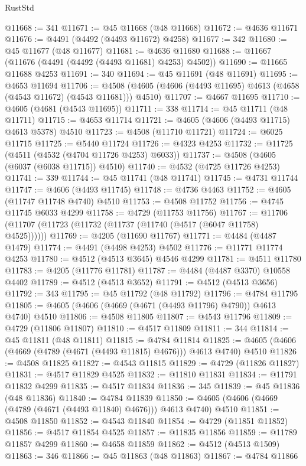\begin{lexlean}{RustStd}
\begin{coremodule}
@11668 := 341
@11671 := @45 @11668 (@48 @11668)
@11672 := @4636 @11671
@11676 := @4491 (@4492 (@4493 @11672) @4258)
@11677 := 342
@11680 := @45 @11677 (@48 @11677)
@11681 := @4636 @11680
@11688 := @11667 (@11676 (@4491 (@4492 (@4493 @11681) @4253) @4502))
@11690 := @11665 @11688 @4253
@11691 := 340
@11694 := @45 @11691 (@48 @11691)
@11695 := @4653 @11694
@11706 := @4508 (@4605 (@4606 (@4493 @11695) @4613 (@4658 (@4543 @11672) (@4543 @11681))) @4510)
@11707 := @4667 @11695
@11710 := @4605 (@4681 (@4543 @11695))
@11711 := 338
@11714 := @45 @11711 (@48 @11711)
@11715 := @4653 @11714
@11721 := @4605 (@4606 (@4493 @11715) @4613 @5378) @4510
@11723 := @4508 (@11710 @11721)
@11724 := @6025 @11715
@11725 := @5440 @11724
@11726 := @4323 @4253
@11732 := @11725 (@4511 (@4532 (@4704 @11726 @4253) @6033))
@11737 := @4508 (@4605 (@6037 (@6038 @11715)) @4510)
@11740 := @4532 (@4725 @11726 @4253)
@11741 := 339
@11744 := @45 @11741 (@48 @11741)
@11745 := @4731 @11744
@11747 := @4606 (@4493 @11745)
@11748 := @4736 @4463
@11752 := @4605 (@11747 @11748 @4740) @4510
@11753 := @4508 @11752
@11756 := @4745 @11745 @6033 @4299
@11758 := @4729 (@11753 @11756)
@11767 := @11706 (@11707 (@11723 (@11732 (@11737 (@11740 (@4517 (@6047 @11758) @4525))))))
@11769 := @4205 (@11690 @11767)
@11771 := @4484 (@4487 @1479)
@11774 := @4491 (@4498 @4253) @4502
@11776 := @11771 @11774 @4253
@11780 := @4512 (@4513 @3645) @4546 @4299
@11781 := @4511 @11780
@11783 := @4205 (@11776 @11781)
@11787 := @4484 (@4487 @3370) @10558 @4402
@11789 := @4512 (@4513 @3652)
@11791 := @4512 (@4513 @3656)
@11792 := 343
@11795 := @45 @11792 (@48 @11792)
@11796 := @4784 @11795
@11805 := @4605 (@4606 (@4669 (@4671 (@4493 @11796) @4790)) @4613 @4740) @4510
@11806 := @4508 @11805
@11807 := @4543 @11796
@11809 := @4729 (@11806 @11807)
@11810 := @4517 @11809
@11811 := 344
@11814 := @45 @11811 (@48 @11811)
@11815 := @4784 @11814
@11825 := @4605 (@4606 (@4669 (@4789 (@4671 (@4493 @11815) @4676))) @4613 @4740) @4510
@11826 := @4508 @11825
@11827 := @4543 @11815
@11829 := @4729 (@11826 @11827)
@11831 := @4517 @11829 @4525
@11832 := @11810 @11831
@11834 := @11791 @11832 @4299
@11835 := @4517 @11834
@11836 := 345
@11839 := @45 @11836 (@48 @11836)
@11840 := @4784 @11839
@11850 := @4605 (@4606 (@4669 (@4789 (@4671 (@4493 @11840) @4676))) @4613 @4740) @4510
@11851 := @4508 @11850
@11852 := @4543 @11840
@11854 := @4729 (@11851 @11852)
@11856 := @4517 @11854 @4525
@11857 := @11835 @11856
@11859 := @11789 @11857 @4299
@11860 := @4658 @11859
@11862 := @4512 (@4513 @1509)
@11863 := 346
@11866 := @45 @11863 (@48 @11863)
@11867 := @4784 @11866

\end{coremodule}
\end{lexlean}
